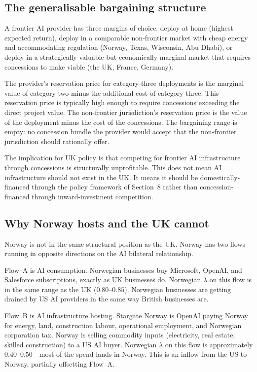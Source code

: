 \documentclass[11pt,letterpaper]{article}
\theoremstyle{remark}
\begin{document}
\subsection{The generalisable bargaining structure}

A frontier {AI} provider has three margins of choice: deploy at home (highest expected return), deploy in a comparable non-frontier market with cheap energy and accommodating regulation (Norway, Texas, Wisconsin, Abu Dhabi), or deploy in a strategically-valuable but economically-marginal market that requires concessions to make viable (the {UK}, France, Germany).

The provider's reservation price for category-three deployments is the marginal value of category-two minus the additional cost of category-three. This reservation price is typically high enough to require concessions exceeding the direct project value. The non-frontier jurisdiction's reservation price is the value of the deployment minus the cost of the concessions. The bargaining range is empty: no concession bundle the provider would accept that the non-frontier jurisdiction should rationally offer.

The implication for {UK} policy is that competing for frontier {AI} infrastructure through concessions is structurally unprofitable. This does not mean {AI} infrastructure should not exist in the {UK}. It means it should be domestically-financed through the policy framework of Section~8 rather than concession-financed through inward-investment competition.

\subsection{Why Norway hosts and the {UK} cannot}

Norway is not in the same structural position as the {UK}. Norway has two flows running in opposite directions on the {AI} bilateral relationship.

Flow~A is {AI} consumption. Norwegian businesses buy Microsoft, OpenAI, and Salesforce subscriptions, exactly as {UK} businesses do. Norwegian $\lambda$ on this flow is in the same range as the {UK} ($0.80$--$0.85$). Norwegian businesses are getting drained by {US} {AI} providers in the same way British businesses are.

Flow~B is {AI} infrastructure hosting. Stargate Norway is OpenAI paying Norway for energy, land, construction labour, operational employment, and Norwegian corporation tax. Norway is selling commodity inputs (electricity, real estate, skilled construction) to a {US} {AI} buyer. Norwegian $\lambda$ on this flow is approximately $0.40$--$0.50$---most of the spend lands in Norway. This is an inflow from the {US} to Norway, partially offsetting Flow~A.
\end{document}
